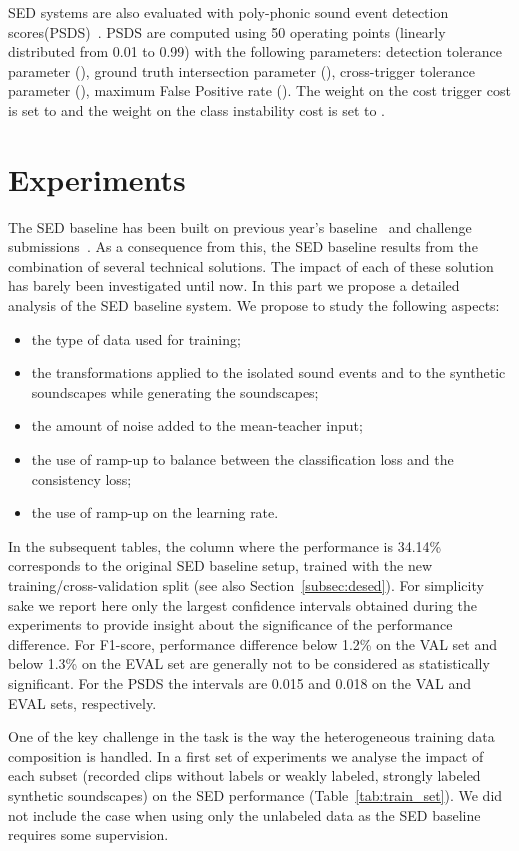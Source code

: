 \documentclass{article}
\begin{document}
\begin{sloppy}
SED systems are also evaluated with poly-phonic sound event detection scores(PSDS)~\cite{Bilen2020}. PSDS are computed using 50 operating points (linearly distributed from 0.01 to 0.99) with the following parameters: detection tolerance parameter (), ground truth intersection parameter (), cross-trigger tolerance parameter (), maximum False Positive rate (). The weight on the cost trigger cost is set to  and the weight on the class instability cost is set to .

\section{Experiments}


The SED baseline has been built on previous year's baseline~\cite{turpault_2019} and challenge submissions~\cite{Lu2018,Delphin-Poulat2019}. As a consequence from this, the SED baseline results from the combination of several technical solutions. The impact of each of these solution has barely been investigated until now. In this part we propose a detailed analysis of the SED baseline system. We propose to study the following aspects:
\begin{itemize}
    \item the type of data used for training;
    \item the transformations applied to the isolated sound events and to the synthetic soundscapes while generating the soundscapes;
    \item the amount of noise added to the mean-teacher input;
    \item the use of ramp-up to balance between the classification loss and the consistency loss;
    \item the use of ramp-up on the learning rate.
\end{itemize}

In the subsequent tables, the column where the performance is 34.14\% corresponds to the original SED baseline setup, trained with the new training/cross-validation split (see also Section~\ref{subsec:desed}). For simplicity sake we report here only the largest confidence intervals obtained during the experiments to provide insight about the significance of the performance difference. For F1-score, performance difference below 1.2\% on the VAL set and below 1.3\% on the EVAL set are generally not to be considered as statistically significant. For the PSDS the intervals are 0.015 and 0.018 on the VAL and EVAL sets, respectively.

One of the key challenge in the task is the way the heterogeneous training data composition is handled. In a first set of experiments we analyse the impact of each subset (recorded clips without labels or weakly labeled, strongly labeled synthetic soundscapes) on the SED performance (Table~\ref{tab:train_set}). We did not include the case when using only the unlabeled data as the SED baseline requires some supervision.


\end{sloppy}
\end{document}
